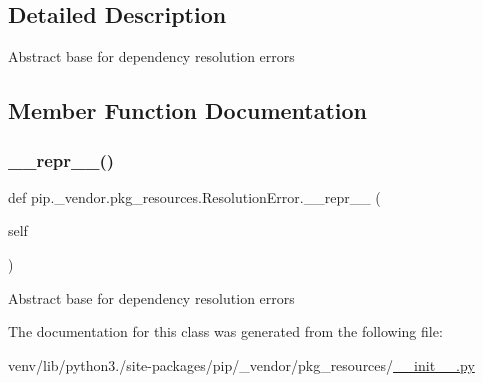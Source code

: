 \subsection{Detailed Description}
\begin{DoxyVerb}Abstract base for dependency resolution errors\end{DoxyVerb}
 

\subsection{Member Function Documentation}
\mbox{\label{classpip_1_1__vendor_1_1pkg__resources_1_1ResolutionError_aead9cc6894a855ac6734326541aa7f2f}} 
\subsubsection{\texorpdfstring{\+\_\+\+\_\+repr\+\_\+\+\_\+()}{\_\_repr\_\_()}}
{\footnotesize\ttfamily def pip.\+\_\+vendor.\+pkg\+\_\+resources.\+Resolution\+Error.\+\_\+\+\_\+repr\+\_\+\+\_\+ (\begin{DoxyParamCaption}\item[{}]{self }\end{DoxyParamCaption})}

\begin{DoxyVerb}Abstract base for dependency resolution errors\end{DoxyVerb}
 

The documentation for this class was generated from the following file\+:\begin{DoxyCompactItemize}
\item 
venv/lib/python3./site-\/packages/pip/\+\_\+vendor/pkg\+\_\+resources/\hyperlink{venv_2lib_2python3_89_2site-packages_2pip_2__vendor_2pkg__resources_2____init_____8py}{\+\_\+\+\_\+init\+\_\+\+\_\+.\+py}\end{DoxyCompactItemize}
